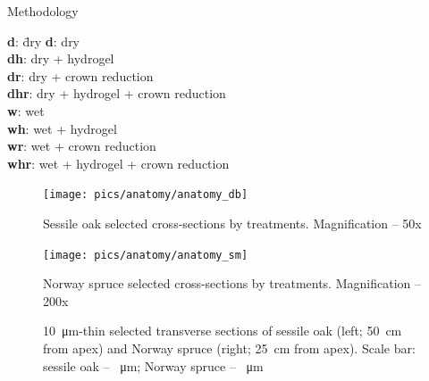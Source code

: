 \documentclass[final]{beamer}
\newlength{\colwidth}
\begin{document}
\begin{frame}[t]
\begin{columns}[t]
\begin{column}{\colwidth}
\begin{block}{Methodology}
\begin{minipage}[t]{0.45\textwidth}
\begin{tabbing}
    \textbf{d}: \quad\= dry \kill
    \textbf{d}: \> dry \\
    \textbf{dh}: \> dry + hydrogel \\
    \textbf{dr}: \> dry + crown reduction \\
    \textbf{dhr}: \> dry + hydrogel + crown reduction \\
    \textbf{w}: \> wet \\
    \textbf{wh}: \> wet + hydrogel \\
    \textbf{wr}: \> wet + crown reduction \\
    \textbf{whr}: \> wet + hydrogel + crown reduction
\end{tabbing}
\end{minipage}\hfill


\begin{figure}
    \begin{minipage}{0.5\textwidth}
        \centering \texttt{[image: pics/anatomy/anatomy\_db]}
        \caption*{Sessile oak selected cross-sections by treatments. Magnification -- 50x}
        \label{fig:anatomy_db}
    \end{minipage}\hfill
    \begin{minipage}{0.5\textwidth}
        \centering \texttt{[image: pics/anatomy/anatomy\_sm]}
        \caption*{Norway spruce selected cross-sections by treatments. Magnification -- 200x}
        \label{fig:anatomy_sm}
    \end{minipage}\hfill
    \caption{\SI{10}{\micro\meter}-thin selected transverse sections of sessile oak (left; \SI{50}{\centi\meter} from apex) and Norway spruce (right; \SI{25}{\centi\meter} from apex). Scale bar: sessile oak -- \SI{}{\micro\meter}; Norway spruce -- \SI{}{\micro\meter}}
    \label{fig:anatomy}
\end{figure}
\end{block}


\end{column}
\end{columns}
\end{frame}
\end{document}
